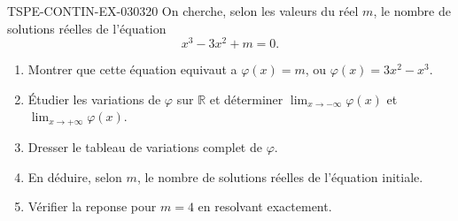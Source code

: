 \begin{exercice}{TSPE-CONTIN-EX-030}{3}{20}
On cherche, selon les valeurs du réel $m$, le nombre de solutions réelles de l'équation
\[ x^3 - 3x^2 + m = 0. \]
\begin{enumerate}
  \item Montrer que cette équation equivaut a $\varphi(x) = m$, ou $\varphi(x) = 3x^2 - x^3$.
  \item Étudier les variations de $\varphi$ sur $\mathbb{R}$ et déterminer $\displaystyle\lim_{x \to -\infty}\varphi(x)$ et $\displaystyle\lim_{x \to +\infty}\varphi(x)$.
  \item Dresser le tableau de variations complet de $\varphi$.
  \item En déduire, selon $m$, le nombre de solutions réelles de l'équation initiale.
  \item Vérifier la reponse pour $m = 4$ en resolvant exactement.
\end{enumerate}
\end{exercice}
